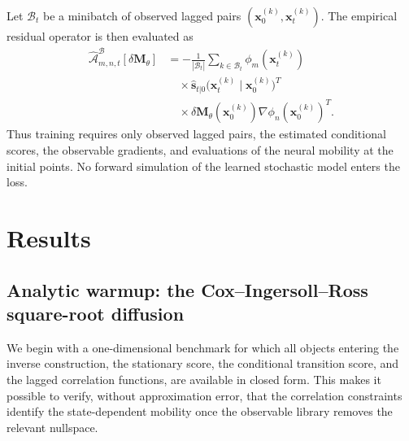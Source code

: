 \documentclass[11pt,twoside,fleqn]{article}
\begin{document}
Let $\mathcal{B}_t$ be a minibatch of observed lagged pairs
$(\bm{x}_0^{(k)},\bm{x}_t^{(k)})$. The empirical residual operator is then evaluated as
\begin{equation}
\begin{aligned}
    \widehat{\mathcal{A}}^{\mathcal{B}}_{m,n,t}
    [\delta\bm{M}_\theta]
    &=
    -
    \frac{1}{|\mathcal{B}_t|}
    \sum_{k\in\mathcal{B}_t}
    \phi_m(\bm{x}_t^{(k)})
    \\
    &\quad\times
    \widehat{\bm{s}}_{t|0}
    \bigl(
        \bm{x}_t^{(k)}
        \mid
        \bm{x}_0^{(k)}
    \bigr)^T
    \\
    &\quad\times
    \delta\bm{M}_\theta(\bm{x}_0^{(k)})
    \nabla\phi_n(\bm{x}_0^{(k)})^T .
\end{aligned}
\label{eq:minibatch_deltaM_operator}
\end{equation}
Thus training requires only observed lagged pairs, the estimated conditional scores, the observable gradients, and evaluations of the neural mobility at the initial points. No forward simulation of the learned stochastic model enters the loss.

\section{Results}
\label{sec:results}

\subsection{Analytic warmup: the Cox--Ingersoll--Ross square-root diffusion}
\label{subsec:cir_benchmark}

We begin with a one-dimensional benchmark for which all objects entering the inverse construction, the stationary score, the conditional transition score, and the lagged correlation functions, are available in closed form. This makes it possible to verify, without approximation error, that the correlation constraints identify the state-dependent mobility once the observable library removes the relevant nullspace.
\end{document}
